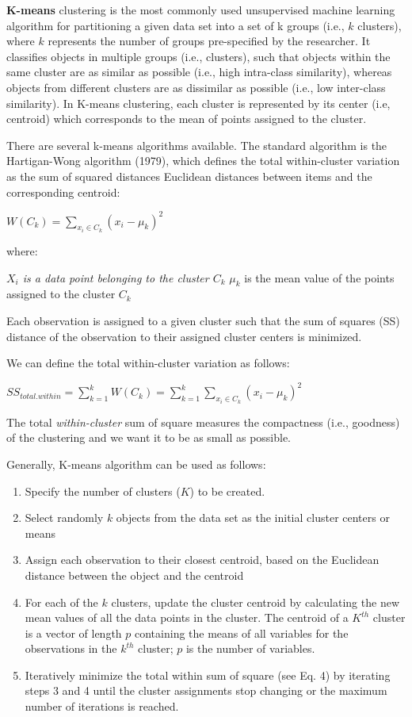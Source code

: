 \documentclass[
]{book}
\providecommand{\tightlist}{%
  \setlength{\itemsep}{0pt}\setlength{\parskip}{0pt}}
\begin{document}
\textbf{K-means} clustering is the most commonly used unsupervised machine learning algorithm for partitioning a given data set into a set of k groups (i.e., \(k\) clusters), where \(k\) represents the number of groups pre-specified by the researcher. It classifies objects in multiple groups (i.e., clusters), such that objects within the same cluster are as similar as possible (i.e., high intra-class similarity), whereas objects from different clusters are as dissimilar as possible (i.e., low inter-class similarity). In K-means clustering, each cluster is represented by its center (i.e, centroid) which corresponds to the mean of points assigned to the cluster.

There are several k-means algorithms available. The standard algorithm is the Hartigan-Wong algorithm (1979), which defines the total within-cluster variation as the sum of squared distances Euclidean distances between items and the corresponding centroid:

\(W(C_k) = \sum_{x_i \in C_k}(x_i - \mu_k)^2\)

where:

\emph{\(X_i\) is a data point belonging to the cluster \(C_k\)
}\(\mu_k\) is the mean value of the points assigned to the cluster \(C_k\)

Each observation is assigned to a given cluster such that the sum of squares (SS) distance of the observation to their assigned cluster centers is minimized.

We can define the total within-cluster variation as follows:

\(SS_{total.within} = \sum^k_{k=1}W(C_k) = \sum^k_{k=1}\sum_{x_i \in C_k}(x_i - \mu_k)^2\)

The total \emph{within-cluster} sum of square measures the compactness (i.e., goodness) of the clustering and we want it to be as small as possible.

Generally, K-means algorithm can be used as follows:

\begin{enumerate}
\def\labelenumi{\arabic{enumi}.}
\tightlist
\item
  Specify the number of clusters (\(K\)) to be created.
\item
  Select randomly \(k\) objects from the data set as the initial cluster centers or means
\item
  Assign each observation to their closest centroid, based on the Euclidean distance between the object and the centroid
\item
  For each of the \(k\) clusters, update the cluster centroid by calculating the new mean values of all the data points in the cluster. The centroid of a \(K^{th}\) cluster is a vector of length \(p\) containing the means of all variables for the observations in the \(k^{th}\) cluster; \(p\) is the number of variables.
\item
  Iteratively minimize the total within sum of square (see Eq. 4) by iterating steps 3 and 4 until the cluster assignments stop changing or the maximum number of iterations is reached.
\end{enumerate}
\end{document}
